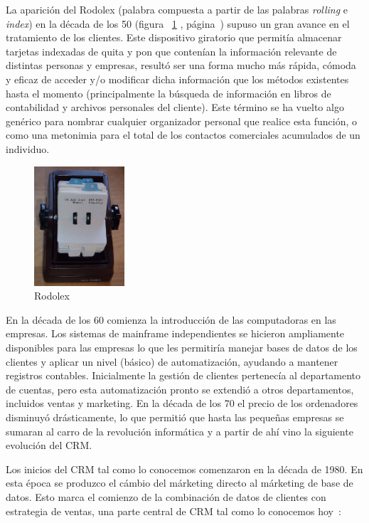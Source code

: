 La aparición del Rodolex (palabra compuesta a partir de las palabras \textit{rolling} e \textit{index}) en la década de los 50 (figura ~\ref{fig:rodolex} , página~\pageref{fig:rodolex}) supuso un gran avance en el tratamiento de los clientes. Este dispositivo giratorio que permitía almacenar tarjetas indexadas de quita y pon que contenían la información relevante de distintas personas y empresas, resultó ser una forma mucho más rápida, cómoda y eficaz de acceder y/o modificar dicha información que los métodos existentes hasta el momento (principalmente la búsqueda de información en libros de contabilidad y archivos personales del cliente). Este término se ha vuelto algo genérico para nombrar cualquier organizador personal que realice esta función, o como una metonimia para el total de los contactos comerciales acumulados de un individuo.


\begin{figure}[H]
  \centering
  \includegraphics[width=0.3\textwidth]{imaxes/rodolex.png}
  \caption{Rodolex}
  \label{fig:rodolex}
\end{figure}




En la década de los 60 comienza la introducción de las computadoras en las empresas. Los sistemas de mainframe independientes se hicieron ampliamente disponibles para las empresas lo que les permitiría manejar bases de datos de los clientes y aplicar un nivel (básico) de automatización, ayudando a mantener registros contables. Inicialmente la gestión de clientes pertenecía al departamento de cuentas, pero esta automatización pronto se extendió a otros departamentos, incluidos ventas y marketing. En la década de los 70 el precio de los ordenadores disminuyó drásticamente, lo que permitió que hasta las pequeñas empresas se sumaran al carro de la revolución informática y a partir de ahí vino la siguiente evolución del CRM.


Los inicios del CRM tal como lo conocemos comenzaron en la década de 1980. En esta época se produzco el cámbio del márketing directo al márketing de base de datos. Esto marca el comienzo de la combinación de datos de clientes con estrategia de ventas, una parte central de CRM tal como lo conocemos hoy~\citep{ThinkautomationCRM}:


